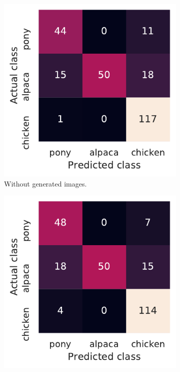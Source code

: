 \documentclass{l4proj}
\begin{document}
\begin{figure}[ht]
  \centering
  \begin{subfigure}[h!]{0.3\textwidth}
    \includegraphics[width=\textwidth]{images/evaluation/autoencoder/confusion_normal}
    \caption{Without generated images.}
    \label{fig:auto_confusion_normal}
  \end{subfigure}
  \begin{subfigure}[h!]{0.3\textwidth}
    \includegraphics[width=\textwidth]{images/evaluation/autoencoder/confusion_autoencoder}

\end{subfigure}
\end{figure}
\end{document}
